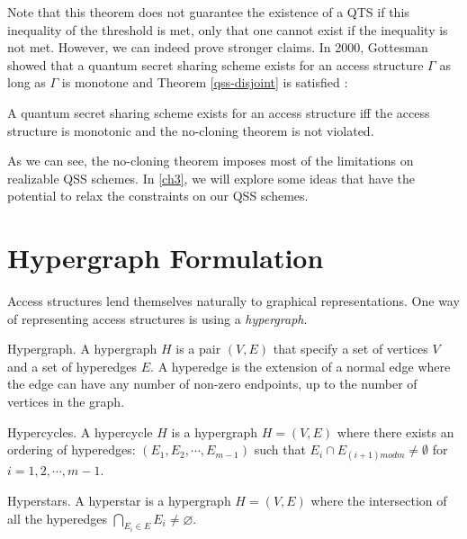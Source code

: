 Note that this theorem does not guarantee the existence of a QTS if this inequality of the threshold is met, only that one cannot exist if the inequality is not met. However, we can indeed prove stronger claims. In 2000, Gottesman showed that a quantum secret sharing scheme exists for an access structure $\Gamma$ as long as $\Gamma$ is monotone and Theorem \ref{qss-disjoint} is satisfied \cite{Gottesman_2000}:

\begin{theorem}
    \label{monotone-gamma}
    A quantum secret sharing scheme exists for an access structure iff the access structure is monotonic and the no-cloning theorem is not violated.
\end{theorem}

As we can see, the no-cloning theorem imposes most of the limitations on realizable QSS schemes. In \cref{ch3}, we will explore some ideas that have the potential to relax the constraints on our QSS schemes. 

 
\section{Hypergraph Formulation}

Access structures lend themselves naturally to graphical representations. One way of representing access structures is using a \textit{hypergraph}.

\theoremstyle{definition}
\begin{definition}{Hypergraph.}
    A hypergraph $H$ is a pair $(V,E)$ that specify a set of vertices $V$ and a set of hyperedges $E$. A hyperedge is the extension of a normal edge where the edge can have any number of non-zero endpoints, up to the number of vertices in the graph.
\end{definition}

\theoremstyle{definition}
\begin{definition}{Hypercycles.}
    A hypercycle $H$ is a hypergraph $H = (V,E)$ where there exists an ordering of hyperedges: $(E_1, E_2, \cdots, E_{m-1})$ such that $E_{i} \cap E_{(i+1) m o d m} \neq \emptyset$ for $i = 1,2,\cdots,m-1$.
\end{definition}

\theoremstyle{definition}
\begin{definition}{Hyperstars.}
    A hyperstar is a hypergraph $H = (V,E)$ where the intersection of all the hyperedges $\bigcap_{E_{i} \in E} E_{i} \neq \varnothing$.
\end{definition}